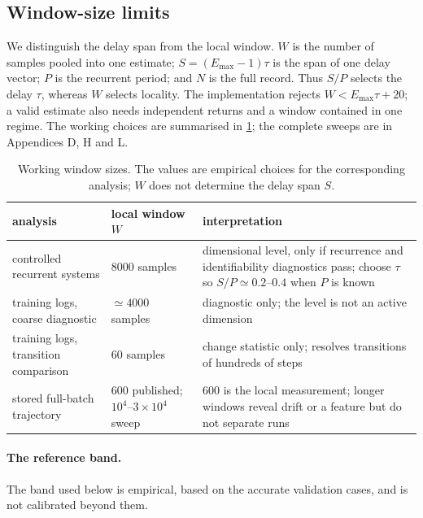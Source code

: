 \documentclass{article}
\newenvironment{claude}{\color{claudecolor}}{}
\begin{document}
\begin{claude}
\subsection{Window-size limits}\label{sec:window-limits}

We distinguish the delay span from the local window. $W$ is the number of samples pooled into one
estimate; $S=(E_{\max}-1)\tau$ is the span of one delay vector; $P$ is the recurrent period; and
$N$ is the full record. Thus $S/P$ selects the delay $\tau$, whereas $W$ selects locality. The
implementation rejects $W<E_{\max}\tau+20$; a valid estimate also needs independent returns and
a window contained in one regime. The working choices are summarised in \cref{tab:window-main};
the complete sweeps are in Appendices D, H and L.

\begin{table}[t]
\centering
\footnotesize
\setlength{\tabcolsep}{4pt}
\caption{Working window sizes. The values are empirical choices for the corresponding analysis;
$W$ does not determine the delay span $S$.}
\label{tab:window-main}
\begin{tabularx}{\linewidth}{@{}>{\raggedright\arraybackslash}p{.25\linewidth}
>{\raggedright\arraybackslash}p{.18\linewidth}X@{}}
\toprule
analysis & local window $W$ & interpretation \\
\midrule
controlled recurrent systems & $8000$ samples & dimensional level, only if recurrence and identifiability diagnostics pass; choose $\tau$ so $S/P\simeq0.2$--$0.4$ when $P$ is known \\
\addlinespace
training logs, coarse diagnostic & $\simeq4000$ samples & diagnostic only; the level is not an active dimension \\
\addlinespace
training logs, transition comparison & $60$ samples & change statistic only; resolves transitions of hundreds of steps \\
\addlinespace
stored full-batch trajectory & $600$ published; $10^4$--$3\times10^4$ sweep & $600$ is the local measurement; longer windows reveal drift or a feature but do not separate runs \\
\bottomrule
\end{tabularx}
\end{table}
\end{claude}

\begin{claude}
\paragraph{The reference band.}\label{sec:diagnostics-validated} The band used below is empirical,
based on the accurate validation cases, and is not calibrated beyond them.
\end{claude}
\end{document}
